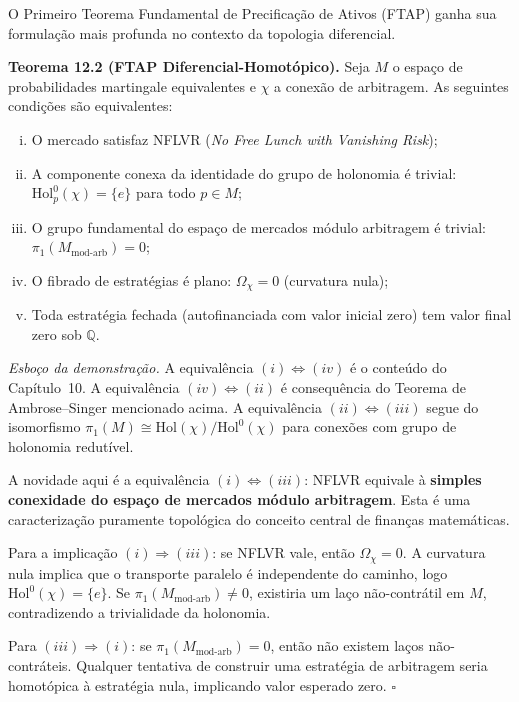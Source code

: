 O Primeiro Teorema Fundamental de Precifica\c{c}\~ao de Ativos (FTAP) ganha sua formula\c{c}\~ao mais profunda no contexto da topologia diferencial.

\smallskip
\noindent\textbf{Teorema 12.2 (FTAP Diferencial-Homot\'opico).} Seja $M$ o espa\c{c}o de probabilidades martingale equivalentes e $\chi$ a conex\~ao de arbitragem. As seguintes condi\c{c}\~oes s\~ao equivalentes:

\begin{enumerate}[(i)]
 \item O mercado satisfaz NFLVR (\textit{No Free Lunch with Vanishing Risk});
 \item A componente conexa da identidade do grupo de holonomia \'e trivial: $\text{Hol}^0_p(\chi) = \{e\}$ para todo $p \in M$;
 \item O grupo fundamental do espa\c{c}o de mercados m\'odulo arbitragem \'e trivial: $\pi_1(M_{\text{mod-arb}}) = 0$;
 \item O fibrado de estrat\'egias \'e plano: $\Omega_\chi = 0$ (curvatura nula);
 \item Toda estrat\'egia fechada (autofinanciada com valor inicial zero) tem valor final zero sob $\mathbb{Q}$.
\end{enumerate}

\medskip
\noindent\textit{Esbo\c{c}o da demonstra\c{c}\~ao.} A equival\^encia $(i) \Leftrightarrow (iv)$ \'e o conte\'udo do Cap\'itulo~10. A equival\^encia $(iv) \Leftrightarrow (ii)$ \'e consequ\^encia do Teorema de Ambrose--Singer mencionado acima. A equival\^encia $(ii) \Leftrightarrow (iii)$ segue do isomorfismo $\pi_1(M) \cong \text{Hol}(\chi)/\text{Hol}^0(\chi)$ para conex\~oes com grupo de holonomia redut\'ivel.

A novidade aqui \'e a equival\^encia $(i) \Leftrightarrow (iii)$: NFLVR equivale \`a \textbf{simples conexidade do espa\c{c}o de mercados m\'odulo arbitragem}. Esta \'e uma caracteriza\c{c}\~ao puramente topol\'ogica do conceito central de finan\c{c}as matem\'aticas.

Para a implica\c{c}\~ao $(i) \Rightarrow (iii)$: se NFLVR vale, ent\~ao $\Omega_\chi = 0$. A curvatura nula implica que o transporte paralelo \'e independente do caminho, logo $\text{Hol}^0(\chi) = \{e\}$. Se $\pi_1(M_{\text{mod-arb}}) \neq 0$, existiria um la\c{c}o n\~ao-contr\'atil em $M$, contradizendo a trivialidade da holonomia.

Para $(iii) \Rightarrow (i)$: se $\pi_1(M_{\text{mod-arb}}) = 0$, ent\~ao n\~ao existem la\c{c}os n\~ao-contr\'ateis. Qualquer tentativa de construir uma estrat\'egia de arbitragem seria homot\'opica \`a estrat\'egia nula, implicando valor esperado zero. $\square$

